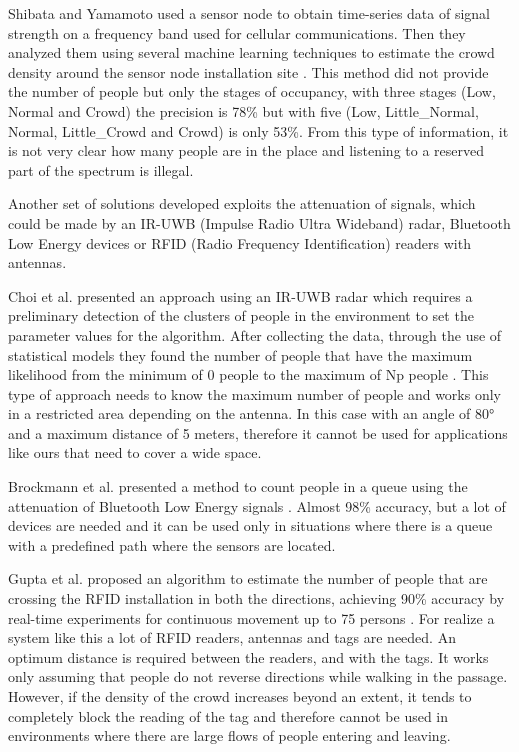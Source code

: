 Shibata and Yamamoto used a sensor node to obtain time-series data of signal strength on a frequency band used for cellular communications. Then they analyzed them using several machine learning techniques to estimate the crowd density around the sensor node installation site \cite{shibata2019people}. This method did not provide the number of people but only the stages of occupancy, with three stages (Low, Normal and Crowd) the precision is 78\% but with five (Low, Little\_Normal, Normal, Little\_Crowd and Crowd) is only 53\%. From this type of information, it is not very clear how many people are in the place and listening to a reserved part of the spectrum is illegal.

Another set of solutions developed exploits the attenuation of signals, which could be made by an IR-UWB (Impulse Radio Ultra Wideband) radar, Bluetooth Low Energy devices or RFID (Radio Frequency Identification) readers with antennas.

Choi et al. presented an approach using an IR-UWB radar which requires a preliminary detection of the clusters of people in the environment to set the parameter values for the algorithm. After collecting the data, through the use of statistical models they found the number of people that have the maximum likelihood from the minimum of 0 people to the maximum of Np people \cite{choi2017people}. This type of approach needs to know the maximum number of people and works only in a restricted area depending on the antenna. In this case with an angle of \ang{80} and a maximum distance of 5 meters, therefore it cannot be used for applications like ours that need to cover a wide space.

Brockmann et al. presented a method to count people in a queue using the attenuation of Bluetooth Low Energy signals \cite{brockmann2018cutiqueue}. Almost 98\% accuracy, but a lot of devices are needed and it can be used only in situations where there is a queue with a predefined path where the sensors are located.

Gupta et al. proposed an algorithm to estimate the number of people that are crossing the RFID installation in both the directions, achieving 90\% accuracy by real-time experiments for continuous movement up to 75 persons \cite{gupta2018device}. For realize a system like this a lot of RFID readers, antennas and tags are needed. An optimum distance is required between the readers, and with the tags. It works only assuming that people do not reverse directions while walking in the passage. However, if the density of the crowd increases beyond an extent, it tends to completely block the reading of the tag and therefore cannot be used in environments where there are large flows of people entering and leaving.


